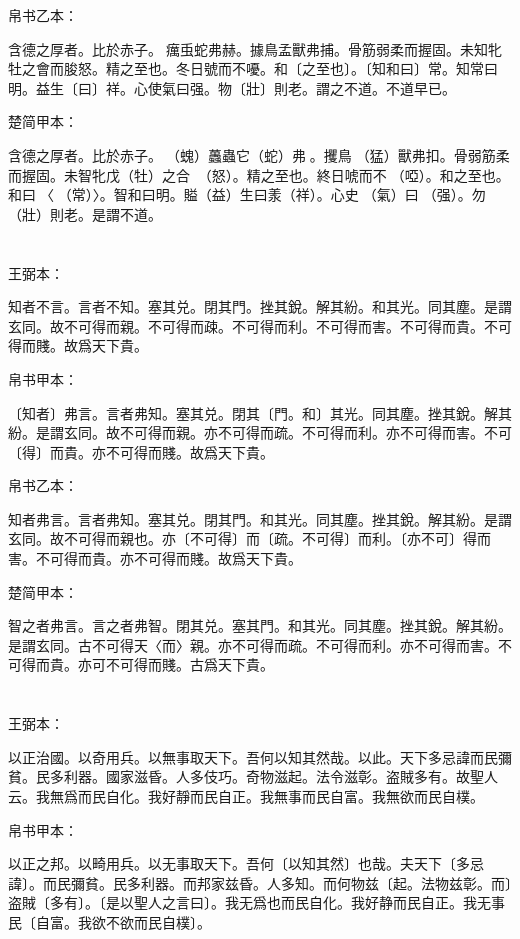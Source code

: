 \documentclass[a5paper]{ctexbook}
\begin{document}
    帛书乙本：

    含德之厚者。比於赤子。𧒒癘䖝蛇弗赫。據鳥孟獸弗捕。骨筋弱柔而握固。未知牝牡之會而朘怒。精之至也。冬日號而不嚘。和〔之至也〕。〔知和曰〕常。知常曰明。益生〔曰〕祥。心使氣曰强。物〔壯〕則老。謂之不道。不道早已。

    楚简甲本：

    含德之厚者。比於赤子。󶵎（螝）䘍蟲它（蛇）弗𧍷。攫鳥󶵏（猛）獸弗扣。骨弱筋柔而握固。未智牝戊（牡）之合󶵑󶵒（怒）。精之至也。終日唬而不𪬐（啞）。和之至也。和曰󶵓〈󼲗（常）〉。智和曰明。賹（益）生曰羕（祥）。心史󶴓（氣）曰󶴔（强）。勿𡒉（壯）則老。是謂不道。

    \chapter{}
    王弼本：

    知者不言。言者不知。塞其兑。閉其門。挫其銳。解其紛。和其光。同其塵。是謂玄同。故不可得而親。不可得而疎。不可得而利。不可得而害。不可得而貴。不可得而賤。故爲天下貴。

    
    帛书甲本：

    〔知者〕弗言。言者弗知。塞其兑。閉其〔門。和〕其光。同其塵。挫其銳。解其紛。是謂玄同。故不可得而親。亦不可得而疏。不可得而利。亦不可得而害。不可〔得〕而貴。亦不可得而賤。故爲天下貴。

    帛书乙本：

    知者弗言。言者弗知。塞其兑。閉其門。和其光。同其塵。挫其銳。解其紛。是謂玄同。故不可得而親也。亦〔不可得〕而〔疏。不可得〕而利。〔亦不可〕得而害。不可得而貴。亦不可得而賤。故爲天下貴。

    楚简甲本：

    智之者弗言。言之者弗智。閉其兑。塞其門。和其光。同其塵。挫其銳。解其紛。是謂玄同。古不可得天〈而〉親。亦不可得而疏。不可得而利。亦不可得而害。不可得而貴。亦可不可得而賤。古爲天下貴。

    \chapter{}
    王弼本：

    以正治國。以奇用兵。以無事取天下。吾何以知其然哉。以此。天下多忌諱而民彌貧。民多利器。國家滋昏。人多伎巧。奇物滋起。法令滋彰。盗賊多有。故聖人云。我無爲而民自化。我好靜而民自正。我無事而民自富。我無欲而民自樸。

    
    帛书甲本：

    以正之邦。以畸用兵。以无事取天下。吾何〔以知其然〕也哉。夫天下〔多忌諱〕。而民彌貧。民多利器。而邦家兹昏。人多知。而何物兹〔起。法物兹彰。而〕盗賊〔多有〕。〔是以聖人之言曰〕。我无爲也而民自化。我好静而民自正。我无事民〔自富。我欲不欲而民自樸〕。
\end{document}
